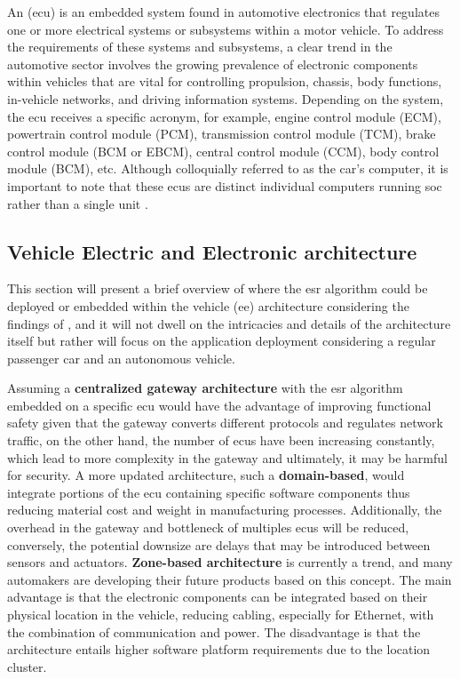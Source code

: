 An  (\gls{ecu}) is an embedded system found in automotive electronics that regulates one or more electrical systems or subsystems within a motor vehicle. To address the requirements of these systems and subsystems, a clear trend in the automotive sector involves the growing prevalence of electronic components within vehicles that are vital for controlling propulsion, chassis, body functions, in-vehicle networks, and driving information systems. Depending on the system, the \gls{ecu} receives a specific acronym, for example, engine control module (ECM), powertrain control module (PCM), transmission control module (TCM), brake control module (BCM or EBCM), central control module (CCM), body control module (BCM), etc. Although colloquially referred to as the car's computer, it is important to note that these \gls{ecu}s are distinct individual computers running \gls{soc} rather than a single unit \cite{Aptiv2020}.


\subsection{Vehicle Electric and Electronic architecture}
\label{subsec:ECU_common_units_in_market}

This section will present a brief overview of where the \gls{esr} algorithm could be deployed or embedded within the vehicle  (\gls{ee}) architecture considering the findings of \textcite{Zhu2021}, and it will not dwell on the intricacies and details of the architecture itself but rather will focus on the application deployment considering a regular passenger car and an autonomous vehicle.

Assuming a \textbf{centralized gateway architecture} with the \gls{esr} algorithm embedded on a specific \gls{ecu} would have the advantage of improving functional safety given that the gateway converts different protocols and regulates network traffic, on the other hand,  the number of \gls{ecu}s have been increasing constantly, which lead to more complexity in the gateway and ultimately, it may be harmful for security. A more updated architecture, such a \textbf{domain-based}, would integrate portions of the \gls{ecu} containing specific software components thus reducing material cost and weight in manufacturing processes. Additionally, the overhead in the gateway and bottleneck of multiples \gls{ecu}s will be reduced, conversely, the potential downsize are delays that may be introduced between sensors and actuators. \textbf{Zone-based architecture} is currently a trend, and many automakers are developing their future products based on this concept. The main advantage is that the electronic components can be integrated based on their physical location in the vehicle, reducing cabling, especially for Ethernet, with the combination of communication and power. The disadvantage is that the architecture entails higher software platform requirements due to the location cluster.

